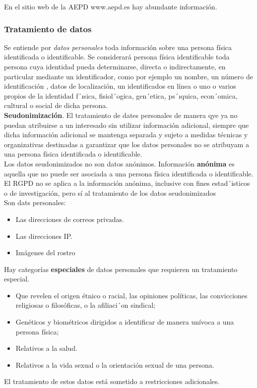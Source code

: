 \documentclass[spanish, 12pt, a4paper, twoside]{article}
\begin{document}
En el sitio web de la AEPD www.aepd.es hay abundante información.

\subsubsection{Tratamiento de datos}

Se entiende por \textit{datos personales} toda información sobre una persona física identificada o identificable.
Se considerará persona física identificable toda persona cuya identidad pueda determinarse, directa o 
indirectamente, en particular mediante un identificador, como por ejemplo un nombre, un número de identificación
, datos de localización, un identificados en línea o uno o varios propios de la identidad f´ısica, fisiol´ogica, gen´etica, ps´ıquica, econ´omica, cultural
o social de dicha persona.\\

\textbf{Seudonimización}. El tratamiento de dates personales de manera qye ya no puedan atribuirse a un interesado
sin utilizar información adicional, siempre que dicha información adicional se mantenga separada y sujeto 
a medidas técnicas y organizativas destinadas a garantizar que los datos personales no se atribuyam a una persona física
identificada o identificable.\\

Los datos seudonimizados no son datos anónimos. Información \textbf{anónima} es aquella que no puede ser asociada a una persona
 física identificada o identificable. El RGPD no se aplica a la información anónima, inclusive con fines
 estad´isticos o de investigación, pero sí al tratamiento de los datos seudonimizados\\

Son dats personales:
\begin{itemize}
    \item Las direcciones de correos privadas.
    \item Las direcciones IP.
    \item Imágenes del rostro
\end{itemize}

Hay categorías \textbf{especiales} de datos personales que requieren un tratamiento especial.\\

\begin{itemize}
    \item Que revelen el origen étnico o racial, las opiniones políticas, las convicciones
    religiosas o filosóficas, o la afiliaci´on sindical;
    \item Genéticos y biométricos dirigidos a identificar de manera unívoca a una
persona física;
    \item Relativos a la salud.
    \item Relativos a la vida sexual o la orientación sexual de una persona.
\end{itemize}
El tratamiento de estos datos está sometido a restricciones adicionales.\\
\end{document}
